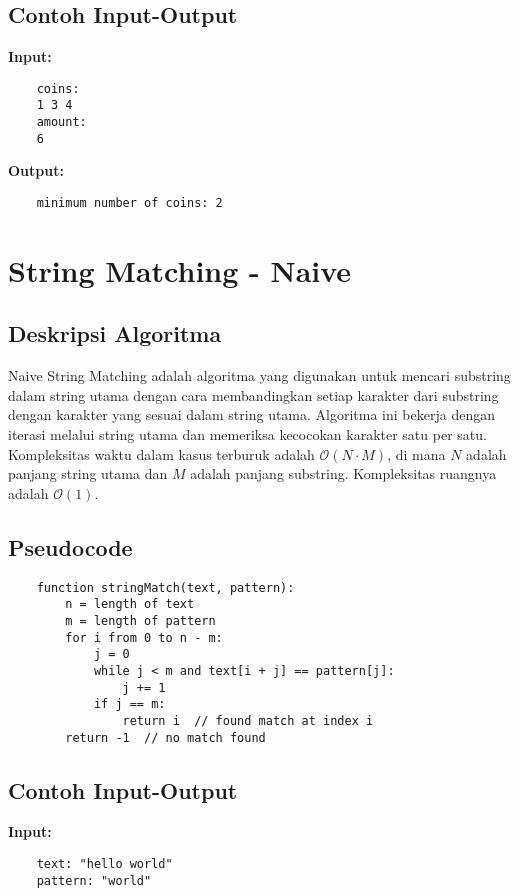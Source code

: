 \subsection{Contoh Input-Output}
\textbf{Input:}
\begin{verbatim}
    coins:
    1 3 4
    amount:
    6
\end{verbatim}

\textbf{Output:}
\begin{verbatim}
    minimum number of coins: 2
\end{verbatim}

\section{String Matching - Naive}
\label{sec:string-matching-implementation}

\subsection{Deskripsi Algoritma}
Naive String Matching adalah algoritma yang digunakan untuk mencari substring dalam string utama dengan cara membandingkan setiap karakter dari substring dengan karakter yang sesuai dalam string utama. Algoritma ini bekerja dengan iterasi melalui string utama dan memeriksa kecocokan karakter satu per satu. Kompleksitas waktu dalam kasus terburuk adalah $\mathcal{O}\left(N \cdot M\right)$, di mana $N$ adalah panjang string utama dan $M$ adalah panjang substring. Kompleksitas ruangnya adalah $\mathcal{O}(1)$.

\subsection{Pseudocode}
\begin{verbatim}
    function stringMatch(text, pattern):
        n = length of text
        m = length of pattern
        for i from 0 to n - m:
            j = 0
            while j < m and text[i + j] == pattern[j]:
                j += 1
            if j == m:
                return i  // found match at index i
        return -1  // no match found
\end{verbatim}

\subsection{Contoh Input-Output}
\textbf{Input:}
\begin{verbatim}
    text: "hello world"
    pattern: "world"
\end{verbatim}

